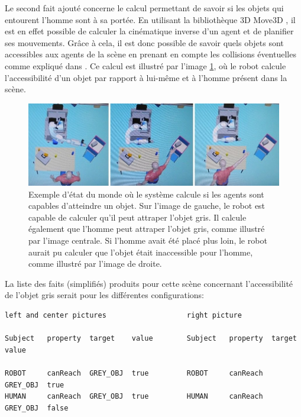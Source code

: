 \documentclass[a4paper,11pt,twoside]{StyleThese}
\begin{document}
Le second fait ajouté concerne le calcul permettant de savoir si les objets qui entourent l'homme sont à sa portée. En utilisant la bibliothèque 3D Move3D  \cite{Simeon2001}, il est en effet possible de calculer la cinématique inverse d'un agent et de planifier ses mouvements. Grâce à cela, il est donc possible de savoir quels objets sont accessibles aux agents de la scène en prenant en compte les collisions éventuelles comme expliqué dans \cite{sisbot2011situation}. Ce calcul est illustré par l'image \ref{fig:reach}, où le robot calcule l'accessibilité d'un objet par rapport à lui-même et à l'homme présent dans la scène.



\begin{figure}[ht!]
 \centering
  \includegraphics[width=0.99\linewidth]{./img/reach.jpg} 
  \caption {Exemple d'état du monde où le système calcule si les agents sont capables d'atteindre un objet. Sur l'image de gauche, le robot est capable de calculer qu'il peut attraper l'objet gris. Il calcule également que l'homme peut attraper l'objet gris, comme illustré par l'image centrale. Si l'homme avait été placé plus loin, le robot aurait pu calculer que l'objet était inaccessible pour l'homme, comme illustré par l'image de droite.}
  \label{fig:reach}
\end{figure}


La liste des faits (simplifiés) produits pour cette scène concernant l'accessibilité de l'objet gris serait pour les différentes configurations:

\begin{scriptsize}
\begin{verbatim}
left and center pictures                   right picture

Subject   property  target    value        Subject   property  target    value

ROBOT     canReach  GREY_OBJ  true         ROBOT     canReach  GREY_OBJ  true
HUMAN     canReach  GREY_OBJ  true         HUMAN     canReach  GREY_OBJ  false
\end{verbatim}
\end{scriptsize}
\end{document}
